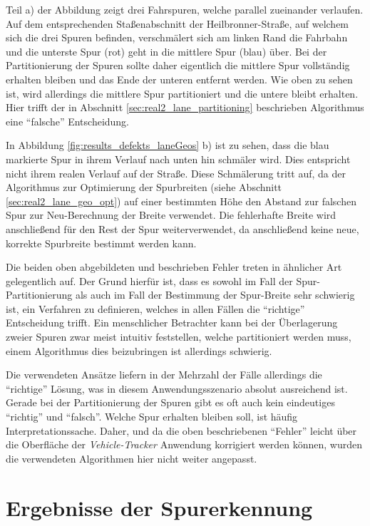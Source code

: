 Teil a) der Abbildung zeigt drei Fahrspuren, welche parallel zueinander verlaufen.
Auf dem entsprechenden Staßenabschnitt der Heilbronner-Straße, auf welchem sich die drei Spuren befinden,
verschmälert sich am linken Rand die Fahrbahn und die unterste Spur (rot) geht in die mittlere Spur (blau) über.
Bei der Partitionierung der Spuren sollte daher eigentlich die mittlere Spur vollständig erhalten bleiben
und das Ende der unteren entfernt werden. Wie oben zu sehen ist, wird allerdings die mittlere Spur partitioniert
und die untere bleibt erhalten. Hier trifft der in Abschnitt \ref{sec:real2_lane_partitioning} beschrieben
Algorithmus eine ``falsche'' Entscheidung.

In Abbildung \ref{fig:results_defekts_laneGeos} b) ist zu sehen, dass die blau markierte Spur
in ihrem Verlauf nach unten hin schmäler wird. Dies entspricht nicht ihrem realen Verlauf auf der Straße.
Diese Schmälerung tritt auf, da der Algorithmus zur Optimierung der Spurbreiten (siehe Abschnitt \ref{sec:real2_lane_geo_opt})
auf einer bestimmten Höhe den Abstand zur falschen Spur zur Neu-Berechnung der Breite verwendet.
Die fehlerhafte Breite wird anschließend für den Rest der Spur weiterverwendet, da anschließend keine neue,
korrekte Spurbreite bestimmt werden kann.

Die beiden oben abgebildeten und beschrieben Fehler treten in ähnlicher Art gelegentlich auf. Der Grund hierfür
ist, dass es sowohl im Fall der Spur-Partitionierung als auch im Fall der Bestimmung der Spur-Breite sehr schwierig ist,
ein Verfahren zu definieren, welches in allen Fällen die ``richtige'' Entscheidung trifft.
Ein menschlicher Betrachter kann bei der Überlagerung zweier Spuren zwar meist intuitiv feststellen, welche
partitioniert werden muss, einem Algorithmus dies beizubringen ist allerdings schwierig.

Die verwendeten Ansätze liefern in der Mehrzahl der Fälle allerdings die ``richtige'' Lösung, was in diesem Anwendungsszenario
absolut ausreichend ist. Gerade bei der Partitionierung der Spuren gibt es oft auch kein eindeutiges ``richtig'' und ``falsch''.
Welche Spur erhalten bleiben soll, ist häufig Interpretationssache. Daher, und da die oben beschriebenen ``Fehler''
leicht über die Oberfläche der \textit{Vehicle-Tracker} Anwendung korrigiert werden können, wurden die verwendeten
Algorithmen hier nicht weiter angepasst.

\section{Ergebnisse der Spurerkennung}

